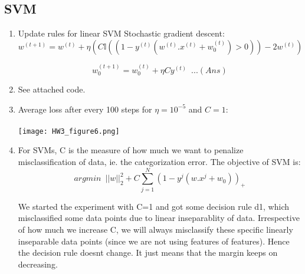 \documentclass[letterpaper]{article}
\begin{document}
	\subsection{SVM}
	
	\begin{enumerate}
		
		\item Update rules for linear SVM Stochastic gradient descent: 
		\begin{equation}
			w^{(t+1)} = w^{(t)} + \eta  (C  \mathbb{I}((1-y^{(t)}(w^{(t)}.x^{(t)} + w_0^{(t)}) > 0)) - 2w^{(t)})
		\end{equation}
		
		\begin{equation}
			w_0^{(t+1)} = w_0^{(t)} + \eta  C  y^{(t)} \,\,\,  ...(Ans)
		\end{equation}
		
		\item See attached code.
		
		\item Average loss after every 100 steps for $\eta = 10^{-5}$ and $C = 1$: \\ \\ 
		\texttt{[image: HW3\_figure6.png]}
		
		\item For SVMs, C is the measure of how much we want to penalize misclassification of data, ie. the categorization error. The objective of SVM is:
		\begin{equation}
			argmin \,\,\,  ||w||_2^2 + C\sum_{j=1}^N{(1-y^j(w.x^j + w_0))_{+}}
		\end{equation}
		
		We started the experiment with C=1 and got some decision rule d1, which misclassified some data points due to linear inseparablity of data. Irrespective of how much we increase C, we will always misclassify these specific linearly inseparable data points (since we are not using features of features). Hence the decision rule doesnt change. It just means that the margin keeps on decreasing.
		

\end{enumerate}
\end{document}
